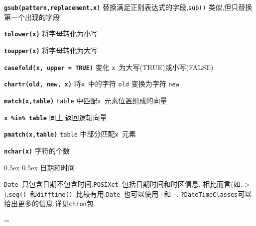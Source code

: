 \documentclass[landscape]{article}
\makeatletter
\renewcommand\section{\@startsection{section}{1}{0mm}%
                                     {0.5ex}%
                                     {0.5ex}%
                                {\color{black}\normalfont\large\bfseries}}
\newcommand{\code}{\texttt}
\newcommand{\bcode}[1]{\texttt{\textbf{#1}}}
\makeatother
\begin{document}
\begin{multicols*}{3}
\bcode{gsub(pattern,replacement,x)} 替换满足正则表达式的字段,\code{sub()} 类似,但只替换第一个出现的字段

\bcode{tolower(x)}  将字母转化为小写

\bcode{toupper(x)}  将字母转化为大写

\bcode{casefold(x, upper = TRUE)}   变化 \code{x}~为大写(TRUE)或小写(FALSE)

\bcode{chartr(old, new, x)} 将\code{x}~中的字符 \code{old} 变换为字符 \code{new}

\bcode{match(x,table)} \code{table} 中匹配\code{x}~元素位置组成的向量.

\bcode{x \%in\% table}  同上.返回逻辑向量

\bcode{pmatch(x,table)} \code{table} 中部分匹配\code{x}~元素

\bcode{nchar(x)} 字符的个数


\section{\color{black}日期和时间}


\code{Date}~只包含日期不包含时间.\code{POSIXct}~包括日期时间和时区信息.
相比而言(如.$>$),\code{seq()}~和\code{difftime()}~比较有用.\code{Date}~也可以使用$+$和$-$.
\code{?DateTimeClasses}可以给出更多的信息.详见\code{chron}包.

\everypar={\hangindent=9mm}



\end{multicols*}
\end{document}
